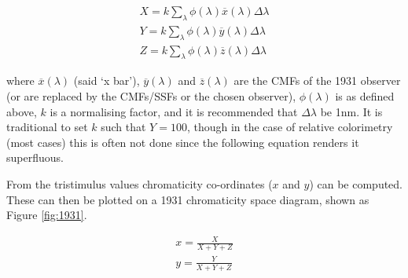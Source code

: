 \begin{subequations}
\begin{align}
X=k \sum_{\lambda} \phi(\lambda) \overline{x}(\lambda) \Delta \lambda \\ 
Y=k \sum_{\lambda} \phi(\lambda) \overline{y}(\lambda) \Delta \lambda \\ 
Z=k \sum_{\lambda} \phi(\lambda) \overline{z}(\lambda) \Delta \lambda
\end{align}
\label{eq:XYZ}
\end{subequations}

\nopagebreak %

where $\overline{x}(\lambda)$ (said `x bar'), $\overline{y}(\lambda)$ and $\overline{z}(\lambda)$ are the \glspl{CMF} of the 1931 observer (or are replaced by the \Glspl{CMF}/\Glspl{SSF} or the chosen observer), $\phi(\lambda)$ is as defined above, $k$ is a normalising factor, and it is recommended that $\Delta\lambda$ be 1nm. It is traditional to set $k$ such that $Y=100$, though in the case of relative colorimetry (most cases) this is often not done since the following equation renders it superfluous.

From the tristimulus values chromaticity co-ordinates ($x$ and $y$) can be computed. These can then be plotted on a 1931 chromaticity space diagram, shown as Figure \ref{fig:1931}.

\begin{subequations}
\begin{align}
x=\frac{X}{X+Y+Z} \\
y=\frac{Y}{X+Y+Z} 
\end{align}
\label{eq:1931chrom}
\end{subequations}






